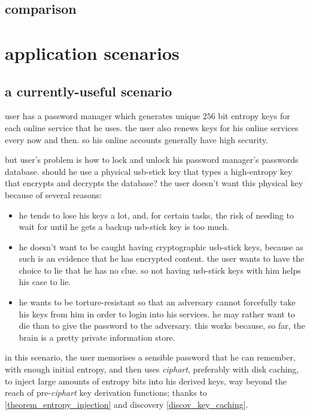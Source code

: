 \documentclass[twocolumn]{article}
\begin{document}
\subsection{comparison}

\section{application scenarios}
\subsection{a currently-useful scenario}
user has a password manager which generates unique $256$ bit entropy keys for
each online service that he uses.  the user also renews keys for his online
services every now and then.   so his online accounts generally have high
security.

but user's problem is how to lock and unlock his password manager's
passwords database.  should he use a physical usb-stick key that types a
high-entropy key that encrypts and decrypts the database?   the user
doesn't want this physical key because of several reasons:
\begin{itemize}
    \item he tends to lose his keys a lot, and, for certain tasks, the risk
    of needing to wait for until he gets a backup usb-stick key is too
    much.

    \item he doesn't want to be caught having cryptographic usb-stick keys,
    because as such is an evidence that he has encrypted content.  the user
    wants to have the choice to lie that he has no clue.  so not having
    usb-stick keys with him helps his case to lie.

    \item he wants to be torture-resistant so that an adversary cannot
    forcefully take his keys from him in order to login into his services.
    he may rather want to die than to give the password to the adversary.
    this works because, so far, the brain is a pretty private information
    store.
\end{itemize}

in this scenario, the user memorises a sensible password that he can
remember, with enough initial entropy, and then uses \emph{ciphart},
preferably with disk caching, to inject large amounts of entropy bits into
his derived keys, way beyond the reach of pre-\emph{ciphart} key derivation
functions; thanks to \cref{theorem_entropy_injection} and discovery
\ref{discov_key_caching}.
\end{document}

